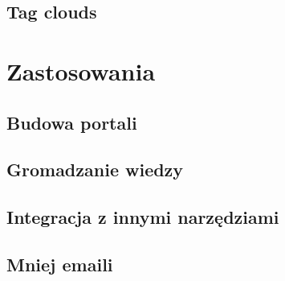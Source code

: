 \documentclass{article}
\begin{document}
	\subsection{Tag clouds}


	


\section{Zastosowania}
	\subsection{Budowa portali}  
	\subsection{Gromadzanie wiedzy}

	\subsection{Integracja z innymi narzędziami}
	\subsection{Mniej emaili}
\end{document}
